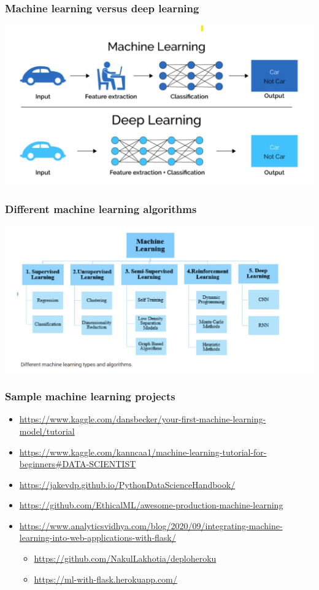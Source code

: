 \documentclass{beamer}
\begin{document}
\begin{frame}
    \frametitle{Machine learning versus deep learning}
    \begin{center}
        \includegraphics[scale=0.5]{figures/ml_vs_deep.jpg}
    \end{center}
\end{frame}

\begin{frame}
    \frametitle{Different machine learning algorithms}
    \begin{center}
        \includegraphics[scale=0.5]{figures/ml_types.jpg}
    \end{center}
\end{frame}

\begin{frame}
    \frametitle{Sample machine learning projects}
    \begin{itemize}
        \item \url{https://www.kaggle.com/dansbecker/your-first-machine-learning-model/tutorial}
        \item \url{https://www.kaggle.com/kanncaa1/machine-learning-tutorial-for-beginners#DATA-SCIENTIST}
        \item \url{https://jakevdp.github.io/PythonDataScienceHandbook/}
        \item \url{https://github.com/EthicalML/awesome-production-machine-learning}
        \item \url{https://www.analyticsvidhya.com/blog/2020/09/integrating-machine-learning-into-web-applications-with-flask/}
        \begin{itemize}
            \tiny
            \item \url{https://github.com/NakulLakhotia/deploheroku}
            \item \url{https://ml-with-flask.herokuapp.com/}
        \end{itemize} 
    \end{itemize}
\end{frame}
\end{document}
